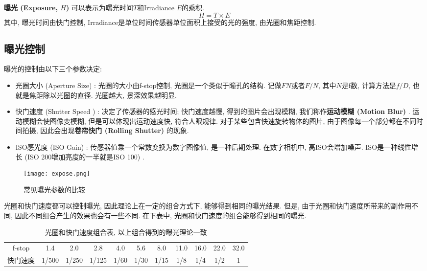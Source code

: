 \textbf{曝光 (Exposure, $H$) }可以表示为曝光时间$T$和Irradiance $E$的乘积. 
\begin{equation}
	H=T\times E
\end{equation}
其中, 曝光时间由快门控制, Irradiance是单位时间传感器单位面积上接受的光的强度, 由光圈和焦距控制. 

\subsection{曝光控制}

曝光的控制由以下三个参数决定: 
\begin{itemize}
	\item 光圈大小 (Aperture Size) : 光圈的大小由f-stop控制, 光圈是一个类似于瞳孔的结构. 记做$FN$或者$F/N$, 其中$N$是f数, 计算方法是$f/D$, 也就是焦距除以光圈的直径. 光圈越大, 景深效果越明显. 
	\item 快门速度 (Shutter Speed ) : 决定了传感器的感光时间; 快门速度越慢, 得到的图片会出现模糊, 我们称作\textbf{运动模糊 (Motion Blur) }. 运动模糊会使图像变模糊, 但是可以体现出运动速度快, 符合人眼规律. 对于某些包含快速旋转物体的图片, 由于图像每一个部分都在不同时间拍摄, 因此会出现\textbf{卷帘快门 (Rolling Shutter) }的现象. 
	\item ISO感光度 (ISO Gain) : 传感器值乘一个常数变换为数字图像值, 是一种后期处理. 在数字相机中, 高ISO会增加噪声. ISO是一种线性增长 (ISO 200增加亮度的一半就是ISO 100) . 
\end{itemize}

\begin{figure}[H]
	\centering
	\texttt{[image: expose.png]}
	\caption{常见曝光参数的比较}
	\label{fig:expose}
\end{figure}

光圈和快门速度都可以控制曝光, 因此理论上在一定的组合方式下, 能够得到相同的曝光结果. 但是, 由于光圈和快门速度所带来的副作用不同, 因此不同组合产生的效果也会有一些不同. 在下表中, 光圈和快门速度的组合能够得到相同的曝光. 

\begin{table}[H]
	\centering
	\begin{tabular}{ccccccccccc}
		\hline
		f-stop & 1.4   & 2.0   & 2.8   & 4.0  & 5.6  & 8.0  & 11.0 & 16.0 & 22.0 & 32.0 \\
		快门速度   & 1/500 & 1/250 & 1/125 & 1/60 & 1/30 & 1/15 & 1/8  & 1/4  & 1/2  & 1 \\	\hline
	\end{tabular}
	\caption{光圈和快门速度组合表, 以上组合得到的曝光理论一致}
\end{table}

